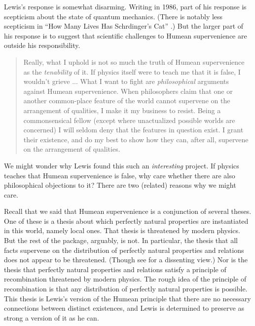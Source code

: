 Lewis's response is somewhat disarming. Writing in 1986, part of his response is scepticism about the state of quantum mechanics. (There is notably less scepticism in ``How Many Lives Has Schrdinger's Cat'' \citeyearpar{Lewis2004b}.) But the larger part of his response is to suggest that scientific challenges to Humean supervenience are outside his responsibility.

\begin{quote} Really, what I uphold is not so much the truth of Humean supervenience as the \textit{tenability} of it. If physics itself were to teach me that it is false, I wouldn't grieve ... What I want to fight are \textit{philosophical} arguments against Humean supervenience. When philosophers claim that one or another common-place feature of the world cannot supervene on the arrangement of qualities, I make it my business to resist. Being a commonsensical fellow (except where unactualized possible worlds are concerned) I will seldom deny that the features in question exist. I grant their existence, and do my best to show how they can, after all, supervene on the arrangement of qualities. \citeyearpar[xi]{Lewis1986b}
\end{quote}

\noindent We might wonder why Lewis found this such an \textit{interesting} project. If physics teaches that Humean supervenience is false, why care whether there are also philosophical objections to it? There are two (related) reasons why we might care.

Recall that we said that Humean supervenience is a conjunction of several theses. One of these is a thesis about which perfectly natural properties are instantiated in this world, namely local ones. That thesis is threatened by modern physics. But the rest of the package, arguably, is not. In particular, the thesis that all facts supervene on the distribution of perfectly natural properties and relations does not appear to be threatened. (Though see \cite[Ch. 2]{Maudlin2007} for a dissenting view.) Nor is the thesis that perfectly natural properties and relations satisfy a principle of recombination threatened by modern physics. The rough idea of the principle of recombination is that any distribution of perfectly natural properties is possible. This thesis is Lewis's version of the Humean principle that there are no necessary connections between distinct existences, and Lewis is determined to preserve as strong a version of it as he can.

